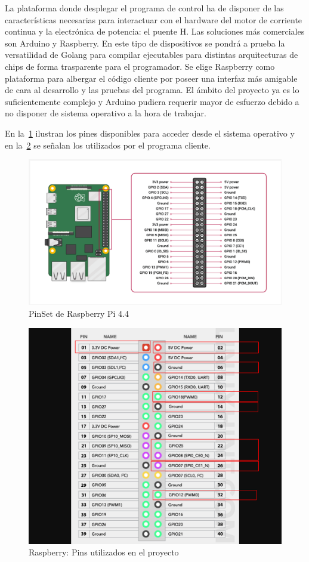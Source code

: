 
La plataforma donde desplegar el programa de control ha de disponer de las características necesarias para interactuar con el hardware del  motor de corriente continua y la electrónica de potencia: el puente H\@.
Las soluciones más comerciales son Arduino y Raspberry.
En este tipo de dispositivos se pondrá a prueba la versatilidad de Golang para compilar ejecutables para distintas arquitecturas de chips de forma trasparente para el programador.
Se elige Raspberry como plataforma para albergar el código cliente por poseer una interfaz más amigable de cara al desarrollo y las pruebas del programa.
El ámbito del proyecto ya es lo suficientemente complejo y Arduino pudiera requerir mayor de esfuerzo debido a no disponer de sistema operativo a la hora de trabajar.

En la~\cref{fig:raspberry pins} ilustran los pines disponibles para acceder desde el sistema operativo y en la~\cref{fig:Used Pins} se señalan los utilizados por el programa cliente.

\begin{figure}[H]
    \centering
    \includegraphics[scale = 0.35]{part/Proyecto_ejecutivo/memoria_constructiva/raspb/img/raspberry}
    \caption{PinSet de Raspberry Pi 4.4\cite{raspberryORG} }\label{fig:raspberry pins}
\end{figure}

\begin{figure}[H]
    \centering
    \includegraphics[scale = 0.3]{part/Proyecto_ejecutivo/memoria_constructiva/raspb/img/gpio-pinout-raspberry-pi-01-used}
    \caption{Raspberry: Pins utilizados en el proyecto}\label{fig:Used Pins}
\end{figure}